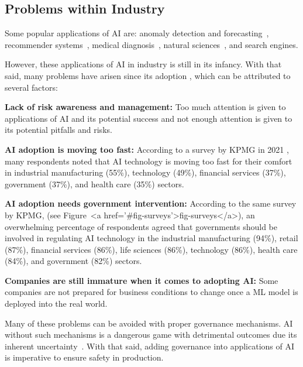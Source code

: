 \documentclass{article}
\begin{document}
\subsection{Problems within Industry}

Some popular applications of AI are: anomaly detection and forecasting~\cite{makridakis2018statistical, sultani2018real,gordeev2020backtesting}, recommender systems~\cite{portugal2018use}, medical diagnosis~\cite{suzuki2017overview,esteva2021deep}, natural sciences~\cite{conde2021weakly, conde2022few, henkel2021recognizing}, and search engines\cite{conde2022general, conde2021clip}.

However, these applications of AI in industry is still in its infancy. With that said, many problems have arisen since its adoption \cite{ai_incidents, floridi2018ai4people, marr2018artificial}, which can be attributed to several factors:

\textbf{Lack of risk awareness and management:} Too much attention is given to applications of AI and its potential success and not enough attention is given to its potential pitfalls and risks.

\textbf{AI adoption is moving too fast:} According to a survey by KPMG in 2021 \cite{KPMG}, many respondents noted that AI technology is moving too fast for their comfort in industrial manufacturing (55\%), technology (49\%), financial services (37\%), government (37\%), and health care (35\%) sectors.

\textbf{AI adoption needs government intervention:} According to the same survey by KPMG, \cite{KPMG} (see Figure~<a href='#fig-surveys'>fig-surveys</a>), an overwhelming percentage of respondents agreed that governments should be involved in regulating AI technology in the industrial manufacturing (94\%), retail (87\%), financial services (86\%), life sciences (86\%), technology (86\%), health care (84\%), and government (82\%) sectors.

\textbf{Companies are still immature when it comes to adopting AI:} Some companies are not prepared for business conditions to change once a ML model is deployed into the real world.

Many of these problems can be avoided with proper governance mechanisms. AI without such mechanisms is a dangerous game with detrimental outcomes due its inherent uncertainty~\cite{zadeh1986probability, bresina2012planning}. 
With that said, adding governance into applications of AI is imperative to ensure safety in production. 
\end{document}
